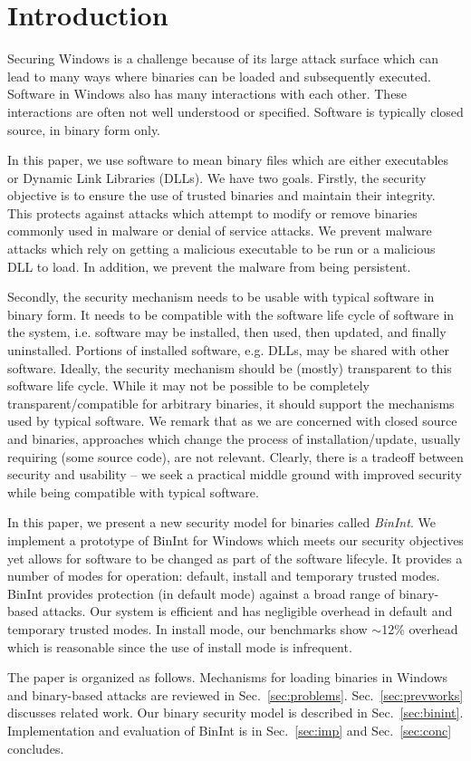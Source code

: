 \section{Introduction}

Securing Windows is a challenge because of its large
attack surface which can lead to many ways where
binaries can be loaded and subsequently executed.
Software in Windows also has many interactions with each other.
These interactions are often not well understood or specified.
Software is typically closed source, in binary form only.

In this paper, we use software to mean binary files which are either
executables or Dynamic Link Libraries (DLLs).
We have two goals. Firstly, the security objective 
is to ensure the use of trusted binaries and maintain their integrity.
This protects against attacks which attempt to modify or remove binaries 
commonly used in malware or denial of service attacks.
We prevent malware attacks which rely on
getting a malicious executable to be run or
a malicious DLL to load.
In addition, we prevent the malware from being persistent.

Secondly, the security mechanism needs to be usable with typical
software in binary form.
It needs to be compatible with the software life cycle of software in the
system, i.e.
software may be installed, then used, then updated, and 
finally uninstalled. 
Portions of installed software, e.g. DLLs,
may be shared with other software. 
Ideally, the security mechanism should be (mostly) transparent to 
this software life cycle.
While it may not be possible to be completely transparent/compatible 
for arbitrary binaries, it should support the mechanisms used 
by typical software.
We remark that as we are concerned with
closed source and binaries,
approaches which change the process of installation/update,
usually requiring (some source code), are not relevant.
Clearly, there is a tradeoff between security and usability --
we seek a practical middle ground with improved security while
being compatible with typical software.

In this paper, we present a new security model
for binaries called {\em BinInt}.
We implement a prototype of BinInt for Windows 
which meets our security objectives yet allows
for software to be changed as part of the software lifecyle.
It provides a number of modes for operation: default, install 
and temporary trusted modes.
BinInt provides protection (in default mode) against a broad range of 
binary-based attacks.
Our system is efficient and has negligible overhead in default and temporary
trusted modes. 
In install mode, our benchmarks
show $\sim$12\% overhead which is reasonable since
the use of install mode is infrequent.

The paper is organized as follows.
Mechanisms for loading binaries in
Windows and binary-based attacks are reviewed in Sec.~\ref{sec:problems}.
Sec.~\ref{sec:prevworks} discusses related work.
Our binary security model is described in Sec.~\ref{sec:binint}.
Implementation and evaluation of BinInt is in
Sec.~\ref{sec:imp} and Sec.~\ref{sec:conc} concludes.

